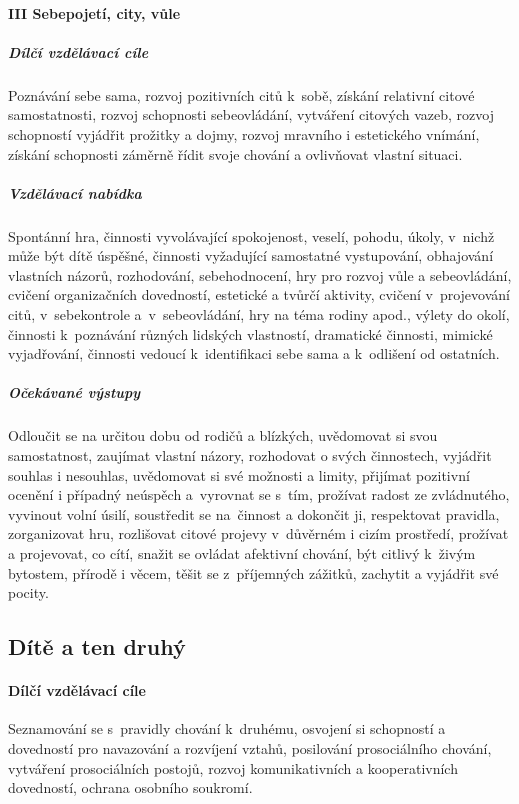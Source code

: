 				\paragraph{III Sebepojetí, city, vůle}

					\subparagraph{Dílčí vzdělávací cíle}
						Poznávání sebe sama, rozvoj pozitivních citů k sobě, získání relativní citové samostatnosti, rozvoj schopnosti sebeovládání, vytváření citových vazeb, rozvoj schopností vyjádřit prožitky a dojmy, rozvoj mravního i estetického vnímání, získání schopnosti záměrně řídit svoje chování a ovlivňovat vlastní situaci.
					\subparagraph{Vzdělávací nabídka}
						Spontánní hra, činnosti vyvolávající spokojenost, veselí, pohodu, úkoly, v nichž může být dítě úspěšné, činnosti vyžadující samostatné vystupování, obhajování vlastních názorů, rozhodování, sebehodnocení, hry pro rozvoj vůle a sebeovládání, cvičení organizačních dovedností, estetické a tvůrčí aktivity, cvičení v projevování citů, v sebekontrole a v sebeovládání, hry na téma rodiny apod., výlety do okolí, činnosti k poznávání různých lidských vlastností, dramatické činnosti, mimické vyjadřování, činnosti vedoucí k identifikaci sebe sama a k odlišení od ostatních.
					\subparagraph{Očekávané výstupy}
						Odloučit se na určitou dobu od rodičů a blízkých, uvědomovat si svou samostatnost, zaujímat vlastní názory, rozhodovat o svých činnostech, vyjádřit souhlas i nesouhlas, uvědomovat si své možnosti a limity, přijímat pozitivní ocenění i případný neúspěch a vyrovnat se s tím, prožívat radost ze zvládnutého, vyvinout volní úsilí, soustředit se na činnost a dokončit ji, respektovat pravidla, zorganizovat hru, rozlišovat citové projevy v důvěrném i cizím prostředí, prožívat a projevovat, co cítí, snažit se ovládat afektivní chování, být citlivý k živým bytostem, přírodě i věcem, těšit se z příjemných zážitků, zachytit a vyjádřit své pocity.

			\subsection{Dítě a ten druhý}
				\textit{} \citep[s.~24]{RVP}
					\paragraph{Dílčí vzdělávací cíle}
						Seznamování se s pravidly chování k druhému, osvojení si schopností a dovedností pro navazování a rozvíjení vztahů, posilování prosociálního chování, vytváření prosociálních postojů, rozvoj komunikativních a kooperativních dovedností, ochrana osobního soukromí.
